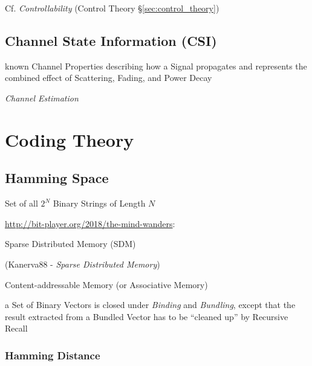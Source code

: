 \fist Cf. \emph{Controllability} (Control Theory
\S\ref{sec:control_theory})



\subsection{Channel State Information (CSI)}\label{sec:csi}

known Channel Properties describing how a Signal propagates and represents the
combined effect of Scattering, Fading, and Power Decay

\emph{Channel Estimation}



\section{Coding Theory}\label{sec:coding_theory}

\subsection{Hamming Space}\label{sec:hamming_space}

Set of all $2^N$ Binary Strings of Length $N$


\url{http://bit-player.org/2018/the-mind-wanders}:

Sparse Distributed Memory (SDM)

(Kanerva88 - \emph{Sparse Distributed Memory})

Content-addressable Memory (or Associative Memory)

a Set of Binary Vectors is closed under \emph{Binding} and \emph{Bundling},
except that the result extracted from a Bundled Vector has to be ``cleaned up''
by Recursive Recall



\subsubsection{Hamming Distance}\label{sec:hamming_distance}

